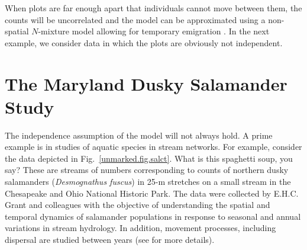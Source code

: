 When plots are far enough apart that
individuals cannot move between them, the counts will be uncorrelated
and the model can be approximated using a non-spatial $N$-mixture model
allowing for temporary emigration \citep{chandler_etal:2011}.
In the next example, we consider data in which the plots are obviously
not independent.


\section{The Maryland Dusky Salamander Study}
The independence assumption of the \citet{chandler_etal:2011} model
will not always hold. A prime example is in studies of aquatic
species in stream networks. For example, consider the data depicted in
Fig.~\ref{unmarked.fig.salct}. What is this spaghetti soup, you say?
These
are streams of numbers corresponding to counts of northern dusky salamanders
(\textit{Desmognathus fuscus}) in 25-m stretches on a small stream in the Chesapeake and
Ohio National Historic Park. The data were collected by E.H.C. Grant
and colleagues with the objective of understanding the spatial and
temporal dynamics of salamander populations in response to seasonal
and annual variations in stream
hydrology. In addition, movement processes, including dispersal are
studied between years (see \citet{grant_etal:2010} for more
details).

